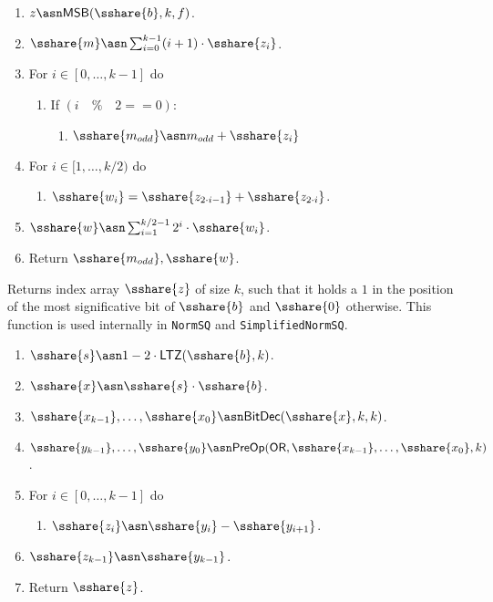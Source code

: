   \begin{enumerate}
    \item $z \asn \mathsf{MSB}(\sshare{b},k,f)$.

    \item $\sshare{m} \asn \sum_{i=0}^{k-1} (i+1) \cdot \sshare{z_i}$.
    \item For $i \in [0,\ldots,k-1]$ do
          \begin{enumerate}
            \item If $(i \quad \% \quad 2 == 0)$:
                  \begin{enumerate}
                    \item $\sshare{m_{odd}} \asn m_{odd} + \sshare{z_{i}}$
                  \end{enumerate}
          \end{enumerate}
    \item For $i \in [1,\ldots,k/2)$ do
          \begin{enumerate}
            \item $\sshare{w_i}=\sshare{z_{2\cdot i-1}}+\sshare{z_{2\cdot i}}$.
          \end{enumerate}
    \item $\sshare{w} \asn \sum_{i=1}^{k/2-1} 2^i \cdot \sshare{w_i}$.

    \item Return $\sshare{m_{odd}}, \sshare{w}$.
  \end{enumerate}

  Returns index array $\sshare{z}$ of size $k$, such that it holds a $1$ in the position of the most significative bit of $\sshare{b}$ and $\sshare{0}$ otherwise. This function is used internally in \verb|NormSQ| and \verb|SimplifiedNormSQ|.
  \begin{enumerate}

    \item $\sshare{s} \asn 1-2 \cdot \mathsf{LTZ}(\sshare{b},k)$.
    \item $\sshare{x} \asn \sshare{s} \cdot \sshare{b}$.
    \item $\sshare{x_{k-1}},\ldots,\sshare{x_0} \asn \mathsf{BitDec}(\sshare{x},k,k)$.
    \item $\sshare{y_{k-1}},\ldots,\sshare{y_0} \asn \mathsf{PreOp}(\mathsf{OR},\sshare{x_{k-1}},\ldots,\sshare{x_0},k)$.
    \item For $i \in [0,\ldots,k-1]$ do
          \begin{enumerate}
            \item $\sshare{z_i} \asn \sshare{y_i}-\sshare{y_{i+1}}$.
          \end{enumerate}
    \item $\sshare{z_{k-1}} \asn \sshare{y_{k-1}}$.
    \item Return $\sshare{z}$.
  \end{enumerate}


